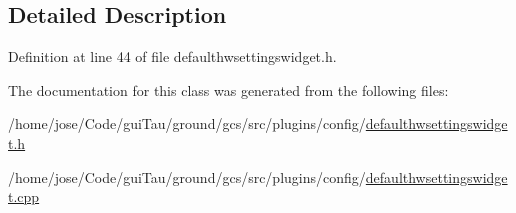 \subsection{Detailed Description}


Definition at line 44 of file defaulthwsettingswidget.\-h.



The documentation for this class was generated from the following files\-:\begin{DoxyCompactItemize}
\item 
/home/jose/\-Code/gui\-Tau/ground/gcs/src/plugins/config/\hyperlink{defaulthwsettingswidget_8h}{defaulthwsettingswidget.\-h}\item 
/home/jose/\-Code/gui\-Tau/ground/gcs/src/plugins/config/\hyperlink{defaulthwsettingswidget_8cpp}{defaulthwsettingswidget.\-cpp}\end{DoxyCompactItemize}
